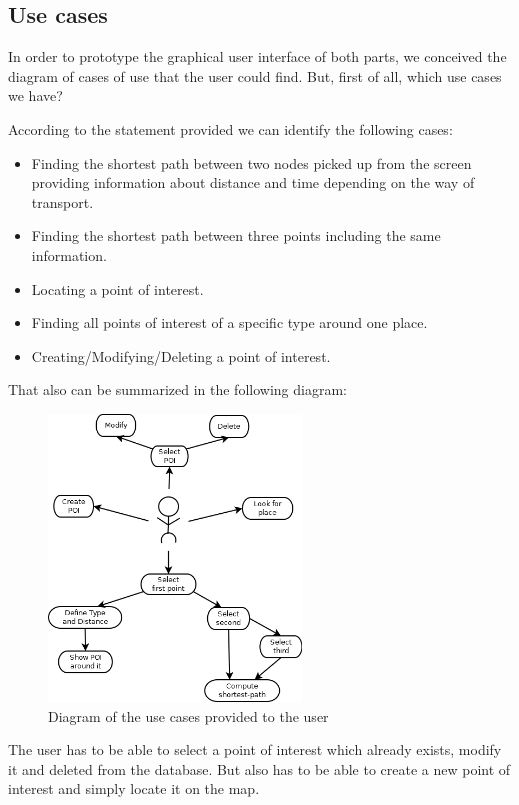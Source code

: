 \documentclass{article}
\begin{document}
\subsection{Use cases}
In order to prototype the graphical user interface of both parts, we conceived the diagram of cases of use that the user could find. But, first of all, which use cases we have?

According to the statement provided we can identify the following cases:

\begin{itemize}
  \item Finding the shortest path between two nodes picked up from the screen providing information about distance and time depending on the way of transport.
  \item Finding the shortest path between three points including the same information.
  \item Locating a point of interest.
  \item Finding all points of interest of a specific type around one place.
  \item Creating/Modifying/Deleting a point of interest.
\end{itemize}

That also can be summarized in the following diagram:

\begin{figure}[h]
\centering
\includegraphics[width=0.6\textwidth]{use_cases.png}
\caption{Diagram of the use cases provided to the user}
\end{figure}

The user has to be able to select a point of interest which already exists, modify it and deleted from the database. But also has to be able to create a new point of interest and simply locate it on the map.
\end{document}
